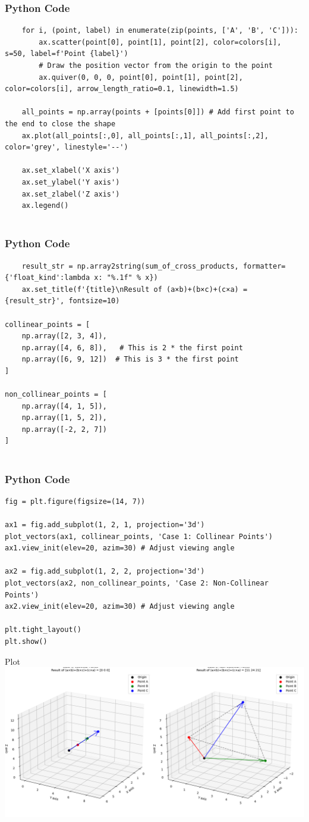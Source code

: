 \documentclass{beamer}
\begin{document}
\begin{frame}[fragile]
    \frametitle{Python Code}
    \begin{lstlisting}
    for i, (point, label) in enumerate(zip(points, ['A', 'B', 'C'])):
        ax.scatter(point[0], point[1], point[2], color=colors[i], s=50, label=f'Point {label}')
        # Draw the position vector from the origin to the point
        ax.quiver(0, 0, 0, point[0], point[1], point[2], color=colors[i], arrow_length_ratio=0.1, linewidth=1.5)

    all_points = np.array(points + [points[0]]) # Add first point to the end to close the shape
    ax.plot(all_points[:,0], all_points[:,1], all_points[:,2], color='grey', linestyle='--')

    ax.set_xlabel('X axis')
    ax.set_ylabel('Y axis')
    ax.set_zlabel('Z axis')
    ax.legend()
   
    \end{lstlisting}
\end{frame}

\begin{frame}[fragile]
    \frametitle{Python Code}
    \begin{lstlisting}
    result_str = np.array2string(sum_of_cross_products, formatter={'float_kind':lambda x: "%.1f" % x})
    ax.set_title(f'{title}\nResult of (a×b)+(b×c)+(c×a) = {result_str}', fontsize=10)

collinear_points = [
    np.array([2, 3, 4]),
    np.array([4, 6, 8]),   # This is 2 * the first point
    np.array([6, 9, 12])  # This is 3 * the first point
]

non_collinear_points = [
    np.array([4, 1, 5]),
    np.array([1, 5, 2]),
    np.array([-2, 2, 7])
]
  
    \end{lstlisting}
\end{frame}

\begin{frame}[fragile]
    \frametitle{Python Code}
    \begin{lstlisting}
fig = plt.figure(figsize=(14, 7))

ax1 = fig.add_subplot(1, 2, 1, projection='3d')
plot_vectors(ax1, collinear_points, 'Case 1: Collinear Points')
ax1.view_init(elev=20, azim=30) # Adjust viewing angle

ax2 = fig.add_subplot(1, 2, 2, projection='3d')
plot_vectors(ax2, non_collinear_points, 'Case 2: Non-Collinear Points')
ax2.view_init(elev=20, azim=30) # Adjust viewing angle

plt.tight_layout()
plt.show()
    \end{lstlisting}
\end{frame}

\begin{frame}{Plot}
    \centering
    \includegraphics[width=\columnwidth, height=0.8\textheight, keepaspectratio]{figs/fig1.png}     
\end{frame}
\end{document}
